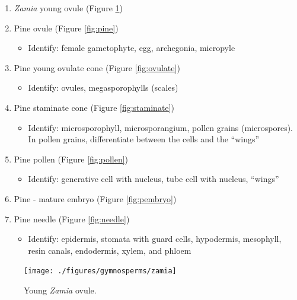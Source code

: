 \documentclass[]{book}
\providecommand{\tightlist}{%
  \setlength{\itemsep}{0pt}\setlength{\parskip}{0pt}}
\theoremstyle{definition}
\theoremstyle{definition}
\theoremstyle{definition}
\theoremstyle{remark}
\begin{document}
\begin{enumerate}
\def\labelenumi{\arabic{enumi}.}
\tightlist
\item
  \emph{Zamia} young ovule (Figure \ref{fig:zamia})
\item
  Pine ovule (Figure \ref{fig:pine})

  \begin{itemize}
  \tightlist
  \item
    Identify: female gametophyte, egg, archegonia, micropyle
  \end{itemize}
\item
  Pine young ovulate cone (Figure \ref{fig:ovulate})

  \begin{itemize}
  \tightlist
  \item
    Identify: ovules, megasporophylls (scales)
  \end{itemize}
\item
  Pine staminate cone (Figure \ref{fig:staminate})

  \begin{itemize}
  \tightlist
  \item
    Identify: microsporophyll, microsporangium, pollen grains
    (microspores). In pollen grains, differentiate between the cells and
    the ``wings''
  \end{itemize}
\item
  Pine pollen (Figure \ref{fig:pollen})

  \begin{itemize}
  \tightlist
  \item
    Identify: generative cell with nucleus, tube cell with nucleus,
    ``wings''
  \end{itemize}
\item
  Pine - mature embryo (Figure \ref{fig:pembryo})
\item
  Pine needle (Figure \ref{fig:needle})

  \begin{itemize}
  \tightlist
  \item
    Identify: epidermis, stomata with guard cells, hypodermis,
    mesophyll, resin canals, endodermis, xylem, and phloem
  \end{itemize}
\end{enumerate}

\begin{figure}

{\centering \texttt{[image: ./figures/gymnosperms/zamia]}

}

\caption{Young \emph{Zamia} ovule.}\label{fig:zamia}
\end{figure}
\end{document}
